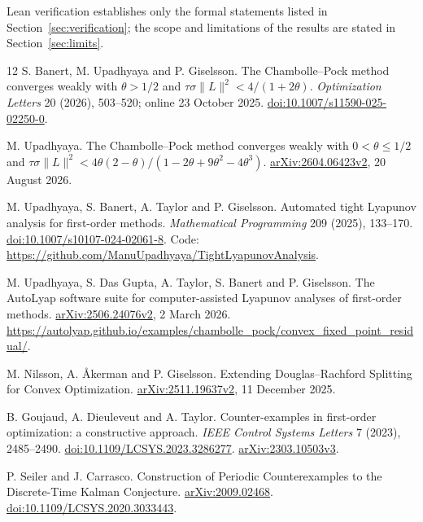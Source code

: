 \documentclass[11pt]{article}
\theoremstyle{remark}\newtheorem{remark}[theorem]{Remark}
\begin{document}
Lean verification establishes only the formal statements listed in Section~\ref{sec:verification}; the scope and limitations of the results are stated in Section~\ref{sec:limits}.

\begin{thebibliography}{12}
\small
{} S. Banert, M. Upadhyaya and P. Giselsson.
The Chambolle--Pock method converges weakly with $\theta>1/2$ and $\tau\sigma\|L\|^2<4/(1+2\theta)$.
\emph{Optimization Letters} 20 (2026), 503--520; online 23 October 2025.
\href{https://doi.org/10.1007/s11590-025-02250-0}{doi:10.1007/s11590-025-02250-0}.

 M. Upadhyaya.
The Chambolle--Pock method converges weakly with $0<\theta\le1/2$ and $\tau\sigma\|L\|^2<4\theta(2-\theta)/(1-2\theta+9\theta^2-4\theta^3)$.
\href{https://arxiv.org/html/2604.06423v2}{arXiv:2604.06423v2}, 20 August 2026.

 M. Upadhyaya, S. Banert, A. Taylor and P. Giselsson.
Automated tight Lyapunov analysis for first-order methods.
\emph{Mathematical Programming} 209 (2025), 133--170.
\href{https://doi.org/10.1007/s10107-024-02061-8}{doi:10.1007/s10107-024-02061-8}.
Code: \url{https://github.com/ManuUpadhyaya/TightLyapunovAnalysis}.

 M. Upadhyaya, S. Das Gupta, A. Taylor, S. Banert and P. Giselsson.
The AutoLyap software suite for computer-assisted Lyapunov analyses of first-order methods.
\href{https://arxiv.org/pdf/2506.24076v2}{arXiv:2506.24076v2}, 2 March 2026.
\url{https://autolyap.github.io/examples/chambolle_pock/convex_fixed_point_residual/}.

 M. Nilsson, A. \AA kerman and P. Giselsson.
Extending Douglas--Rachford Splitting for Convex Optimization.
\href{https://arxiv.org/html/2511.19637v2}{arXiv:2511.19637v2}, 11 December 2025.

 B. Goujaud, A. Dieuleveut and A. Taylor.
Counter-examples in first-order optimization: a constructive approach.
\emph{IEEE Control Systems Letters} 7 (2023), 2485--2490.
\href{https://doi.org/10.1109/LCSYS.2023.3286277}{doi:10.1109/LCSYS.2023.3286277}.
\href{https://arxiv.org/html/2303.10503v3}{arXiv:2303.10503v3}.

 P. Seiler and J. Carrasco.
Construction of Periodic Counterexamples to the Discrete-Time Kalman Conjecture.
\href{https://arxiv.org/abs/2009.02468}{arXiv:2009.02468}.
\href{https://doi.org/10.1109/LCSYS.2020.3033443}{doi:10.1109/LCSYS.2020.3033443}.


\end{thebibliography}
\end{document}
